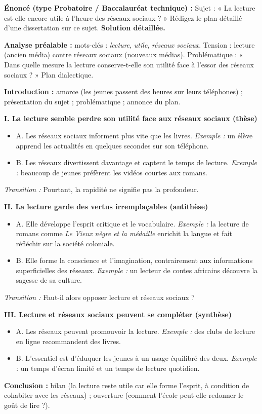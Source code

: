 \documentclass[11pt]{article}
\begin{document}
\begin{exoresolu}
\textbf{Énoncé (type Probatoire / Baccalauréat technique) :} Sujet : « La lecture est-elle encore utile à l'heure des réseaux sociaux ? » Rédigez le plan détaillé d'une dissertation sur ce sujet.
\tcblower
\textbf{Solution détaillée.}

\textbf{Analyse préalable :} mots-clés : \emph{lecture}, \emph{utile}, \emph{réseaux sociaux}. Tension : lecture (ancien média) contre réseaux sociaux (nouveaux médias). Problématique : « Dans quelle mesure la lecture conserve-t-elle son utilité face à l'essor des réseaux sociaux ? » Plan dialectique.

\textbf{Introduction :} amorce (les jeunes passent des heures sur leurs téléphones) ; présentation du sujet ; problématique ; annonce du plan.

\textbf{I. La lecture semble perdre son utilité face aux réseaux sociaux (thèse)}
\begin{itemize}
\item A. Les réseaux sociaux informent plus vite que les livres. \emph{Exemple :} un élève apprend les actualités en quelques secondes sur son téléphone.
\item B. Les réseaux divertissent davantage et captent le temps de lecture. \emph{Exemple :} beaucoup de jeunes préfèrent les vidéos courtes aux romans.
\end{itemize}
\emph{Transition :} Pourtant, la rapidité ne signifie pas la profondeur.

\textbf{II. La lecture garde des vertus irremplaçables (antithèse)}
\begin{itemize}
\item A. Elle développe l'esprit critique et le vocabulaire. \emph{Exemple :} la lecture de romans comme \emph{Le Vieux nègre et la médaille} enrichit la langue et fait réfléchir sur la société coloniale.
\item B. Elle forme la conscience et l'imagination, contrairement aux informations superficielles des réseaux. \emph{Exemple :} un lecteur de contes africains découvre la sagesse de sa culture.
\end{itemize}
\emph{Transition :} Faut-il alors opposer lecture et réseaux sociaux ?

\textbf{III. Lecture et réseaux sociaux peuvent se compléter (synthèse)}
\begin{itemize}
\item A. Les réseaux peuvent promouvoir la lecture. \emph{Exemple :} des clubs de lecture en ligne recommandent des livres.
\item B. L'essentiel est d'éduquer les jeunes à un usage équilibré des deux. \emph{Exemple :} un temps d'écran limité et un temps de lecture quotidien.
\end{itemize}

\textbf{Conclusion :} bilan (la lecture reste utile car elle forme l'esprit, à condition de cohabiter avec les réseaux) ; ouverture (comment l'école peut-elle redonner le goût de lire ?).
\end{exoresolu}
\end{document}
